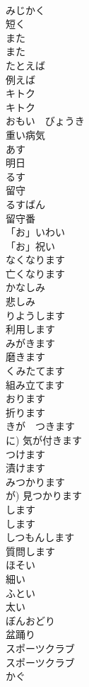 \documentclass[8pt]{extreport}
\begin{document}
\begin{CJK}{UTF8}{min}
\\	みじかく	
\\	短く		
\\	また	
\\	また		
\\	たとえば	
\\	例えば		
\\	キトク	
\\	キトク		
\\	おもい　びょうき	
\\	重い病気		
\\	あす	
\\	明日		
\\	るす	
\\	留守		
\\	るすばん	
\\	留守番		
\\	「お」いわい	
\\	「お」祝い		
\\	なくなります	
\\	亡くなります		
\\	かなしみ	
\\	悲しみ		
\\	りようします	
\\	利用します		
\\	みがきます	
\\	磨きます	
\\	くみたてます	
\\	組み立てます		
\\	おります	
\\	折ります		
\\	きが　つきます	
\\	に)	気が付きます	
\\	つけます	
\\	漬けます	
\\	みつかります	
\\	が)	見つかります	
\\	します 
\\	します
\\	しつもんします	
\\	質問します	
\\	ほそい	
\\	細い	
\\	ふとい	
\\	太い		
\\	ぼんおどり	
\\	盆踊り		
\\	スポーツクラブ	
\\	スポーツクラブ	
\\	かぐ	

\end{CJK}
\end{document}
